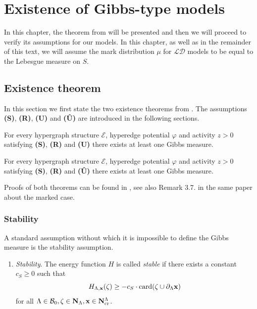 \chapter{Existence of Gibbs-type models}\label{ch:3}
In this chapter, the theorem from \cite{DDG12} will be presented and then we will proceed to verify its assumptions for our models. In this chapter, as well as in the remainder of this text, we will assume  the mark distribution $\mu$ for $\mathcal {LD}$ models to be equal to the Lebesgue measure on $S$.

\section{Existence theorem}
In this section we first state the two existence theorems from \cite{DDG12}. The assumptions  \textbf{(S)}, \textbf{(R)}, \textbf{(U)} and \textbf{(\^U)} are introduced in the following sections. 

\begin{theorem}
	For every hypergraph structure $\mathcal E$, hyperedge potential $\varphi$ and activity $z>0$ satisfying \textbf{(S)}, \textbf{(R)} and \textbf{(U)} there exists at least one Gibbs measure.
\end{theorem}

\begin{theorem}
	For every hypergraph structure $\mathcal E$, hyperedge potential $\varphi$ and activity $z>0$ satisfying \textbf{(S)}, \textbf{(R)} and \textbf{(\^{U})} there exists at least one Gibbs measure.
\end{theorem}

Proofs of both theorems can be found in \cite{DDG12}, see also Remark 3.7. in the same paper about the marked case.

\subsection{Stability}\label{sec:stability}
A standard assumption without which it is impossible to define the Gibbs measure is the stability assumption. 

\begin{enumerate}[\textbf{(S)}] 
	\item \textit{Stability}. The energy function $H$ is called \textit{stable} if there exists a constant $c_S \geq 0$ such that 
		$$H_{\Lambda,{\mathbf{x}}}(\zeta) \geq -c_S \cdot \mathrm{card}(\zeta \cup \partial_\Lambda {\mathbf{x}})$$
		for all $\Lambda \in \mathcal B_0, \zeta \in \mathbf N_\Lambda, {\mathbf{x}} \in \mathbf N^\Lambda_{\text{cr}}$.
\end{enumerate}


